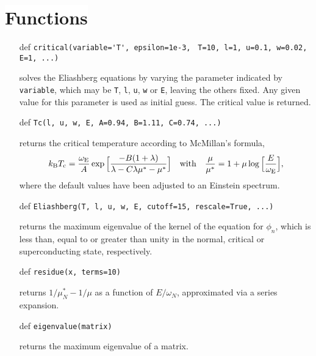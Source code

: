 \documentclass[a4paper]{article}
\def\sub#1{\sb{\mathrm{#1}}}
\def\headline#1{\section*{\normalsize\normalfont%
   \rlap{\rule[0.5ex]{\textwidth}{0.4pt}}\qquad\colorbox{white}{#1}}}
\begin{document}
   \headline{Functions}

   \begin{itemize}
      \item[def]
         \verb|critical(variable='T', epsilon=1e-3,|
         \verb| T=10, l=1, u=0.1, w=0.02, E=1, ...)|

      solves the Eliashberg equations by varying the parameter indicated by
      \verb|variable|, which may be \verb|T|, \verb|l|, \verb|u|, \verb|w| or
      \verb|E|, leaving the others fixed. Any given value for this parameter is
      used as initial guess. The critical value is returned.

      \item[def] \verb|Tc(l, u, w, E, A=0.94, B=1.11, C=0.74, ...)|

      returns the critical temperature according to McMillan's formula,
      \begin{equation*}
         k \sub B T \sub c = \frac {\omega \sub E} A \exp
         \Big[ \frac{-B (1 + \lambda)}{\lambda - C \lambda \mu^* - \mu^*} \Big]
         \quad \text{with} \quad
         \frac \mu {\mu^*} = 1 + \mu \log \Big[ \frac E {\omega \sub E} \Big],
      \end{equation*}
      where the default values have been adjusted to an Einstein spectrum.

      \item[def] \verb|Eliashberg(T, l, u, w, E, cutoff=15, rescale=True, ...)|

      returns the maximum eigenvalue of the kernel of the equation for $\phi_n$,
      which is less than, equal to or greater than unity in the normal, critical
      or superconducting state, respectively.

      \item[def] \verb|residue(x, terms=10)|

      returns $1 / \mu^*_N - 1 / \mu$ as a function of $E / \omega_N$,
      approximated via a series expansion.

      \item[def] \verb|eigenvalue(matrix)|

      returns the maximum eigenvalue of a matrix.
   \end{itemize}
\end{document}

